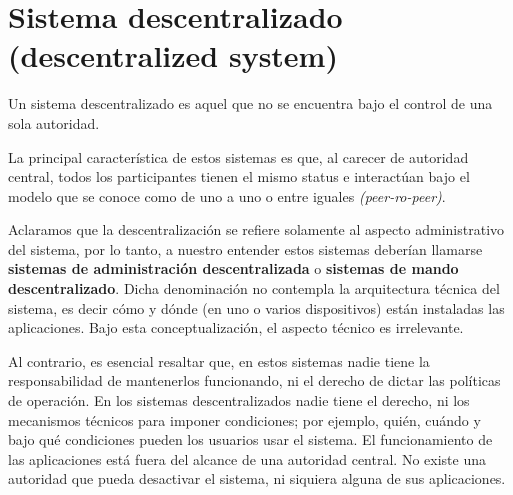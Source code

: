 \documentclass[12pt]{report} %
\begin{document}
\section{Sistema descentralizado (descentralized system)}

Un sistema descentralizado es aquel que no se encuentra bajo el control de una sola autoridad.

La principal característica de estos sistemas es que, al carecer de autoridad central, todos los participantes tienen el mismo status e interactúan bajo el modelo que se conoce como de uno a uno o entre iguales \textit{(peer-ro-peer)}.  

Aclaramos que la descentralización se refiere solamente al aspecto administrativo del sistema, por lo tanto, a nuestro entender estos sistemas deberían llamarse \textbf{sistemas de administración descentralizada} o \textbf{sistemas de mando descentralizado}. Dicha denominación no contempla la arquitectura técnica del sistema, es decir cómo y dónde (en uno o varios dispositivos) están instaladas las aplicaciones. Bajo esta conceptualización, el aspecto técnico es irrelevante. 

Al contrario, es esencial resaltar que, en estos sistemas nadie tiene la responsabilidad de mantenerlos funcionando, ni el derecho de dictar las políticas de operación. En los sistemas descentralizados nadie tiene el derecho, ni los mecanismos técnicos para imponer condiciones; por ejemplo, quién, cuándo y bajo qué condiciones pueden los usuarios usar el sistema. El funcionamiento de las aplicaciones está fuera del alcance de una autoridad central. No existe una autoridad que pueda desactivar el sistema, ni siquiera alguna de sus aplicaciones.
\end{document}
